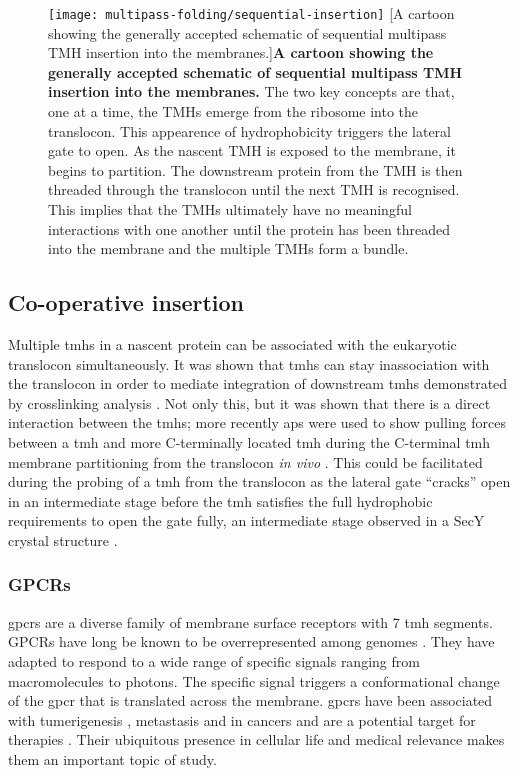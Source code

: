 \begin{figure}[!ht]
\centering
\texttt{[image: multipass-folding/sequential-insertion]}
        [A cartoon showing the generally accepted schematic of sequential multipass TMH insertion into the membranes.]{\textbf{A cartoon showing the generally accepted schematic of sequential multipass TMH insertion into the membranes.}
        The two key concepts are that, one at a time, the TMHs emerge from the ribosome into the translocon.
        This appearence of hydrophobicity triggers the lateral gate to open.
        As the nascent TMH is exposed to the membrane, it begins to partition.
        The downstream protein from the TMH is then threaded through the translocon until the next TMH is recognised.
        This implies that the TMHs ultimately have no meaningful interactions with one another until the protein has been threaded into the membrane and the multiple TMHs form a bundle.
}
\label{fig:sequential-insertion}
\end{figure}

\subsection{Co-operative insertion}
Multiple \gls{tmh}s in a nascent protein can be associated with the eukaryotic translocon simultaneously.
It was shown that \gls{tmh}s can stay inassociation with the translocon in order to mediate integration of downstream \gls{tmh}s demonstrated by crosslinking analysis \cite{Sadlish2005, Cross2009}.
Not only this, but it was shown that there is a direct interaction between the \gls{tmh}s; more recently \gls{ap}s were used to show pulling forces between a \gls{tmh} and more C-terminally located \gls{tmh} during the C-terminal \gls{tmh} membrane partitioning from the translocon \textit{in vivo} \cite{Cymer2013}.
This could be facilitated during the probing of a \gls{tmh} from the translocon as the lateral gate ``cracks'' open in an intermediate stage before the \gls{tmh} satisfies the full hydrophobic requirements to open the gate fully, an intermediate stage observed in a SecY crystal structure \cite{Egea2010}.

\subsubsection{GPCRs}

\gls{gpcr}s are a diverse family of membrane surface receptors with 7 \gls{tmh} segments.
GPCRs have long be known to be overrepresented among genomes \cite{Remm2000}.
They have adapted to respond to a wide range of specific signals ranging from macromolecules to photons.
The specific signal triggers a conformational change of the \gls{gpcr} that is translated across the membrane.
\gls{gpcr}s have been associated with tumerigenesis \cite{OHayre2013}, metastasis \cite{Singh2015} and in cancers \cite{Bar-Shavit2016} and are a potential target for therapies \cite{Arakaki2018}.
Their ubiquitous presence in cellular life and medical relevance makes them an important topic of study.

